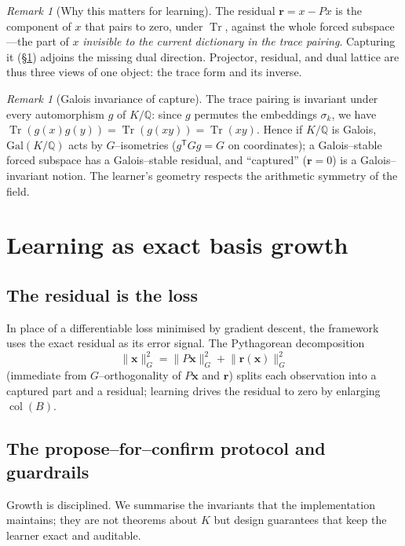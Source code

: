 \documentclass[11pt]{article}
\theoremstyle{plain}
\theoremstyle{definition}
\theoremstyle{remark}
\newtheorem{remark}[theorem]{Remark}
\newcommand{\Q}{\mathbb{Q}}
\newcommand{\K}{K}
\newcommand{\Tr}{\operatorname{Tr}}
\newcommand{\rr}{\mathbf{r}}
\newcommand{\xx}{\mathbf{x}}
\newcommand{\GG}{G}
\newcommand{\BB}{B}
\newcommand{\transpose}{^{\mathsf{T}}}
\DeclareMathOperator{\col}{col}
\begin{document}
\begin{remark}[Why this matters for learning]\label{rem:dual}
The residual $\rr=x-Px$ is the component of $x$ that pairs to zero, under $\Tr$, against the whole forced
subspace---the part of $x$ \emph{invisible to the current dictionary in the trace pairing}. Capturing it
(\S\ref{sec:learning}) adjoins the missing dual direction. Projector, residual, and dual lattice are thus
three views of one object: the trace form and its inverse.
\end{remark}

\begin{remark}[Galois invariance of capture]\label{rem:galois}
The trace pairing is invariant under every automorphism $g$ of $\K/\Q$: since $g$ permutes the embeddings
$\sigma_k$, we have $\Tr(g(x)g(y))=\Tr(g(xy))=\Tr(xy)$. Hence if $\K/\Q$ is Galois, $\mathrm{Gal}(\K/\Q)$ acts by
$\GG$--isometries ($g\transpose\GG g=\GG$ on coordinates); a Galois--stable forced subspace has a
Galois--stable residual, and ``captured'' ($\rr=0$) is a Galois--invariant notion. The learner's geometry
respects the arithmetic symmetry of the field.
\end{remark}

\section{Learning as exact basis growth}\label{sec:learning}

\subsection{The residual is the loss}
In place of a differentiable loss minimised by gradient descent, the framework uses the exact residual as
its error signal. The Pythagorean decomposition
\begin{equation}\label{eq:pythagoras}
  \lVert\xx\rVert_{\GG}^2=\lVert P\xx\rVert_{\GG}^2+\lVert\rr(\xx)\rVert_{\GG}^2
\end{equation}
(immediate from $\GG$--orthogonality of $P\xx$ and $\rr$) splits each observation into a captured part and a
residual; learning drives the residual to zero by enlarging $\col(\BB)$.

\subsection{The propose--for--confirm protocol and guardrails}\label{subsec:protocol}
Growth is disciplined. We summarise the invariants that the implementation maintains; they are not theorems
about $\K$ but design guarantees that keep the learner exact and auditable.
\end{document}
